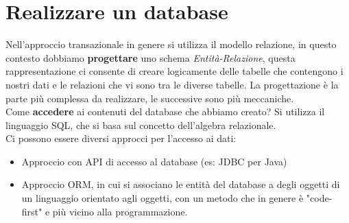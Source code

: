 \documentclass[a4paper,12pt]{report}
\begin{document}
\section{Realizzare un database}
Nell'approccio transazionale in genere si utilizza il modello relazione, in questo contesto dobbiamo \textbf{progettare} uno schema \textit{Entità-Relazione}, questa rappresentazione ci consente di creare logicamente delle tabelle che contengono i nostri dati e le relazioni che vi sono tra le diverse tabelle. La progettazione è la parte più complessa da realizzare, le successive sono più meccaniche.\\
Come \textbf{accedere} ai contenuti del database che abbiamo creato? Si utilizza il linguaggio SQL, che si basa sul concetto dell'algebra relazionale.\\
Ci possono essere diversi approcci per l'accesso ai dati:
\begin{itemize}
	\item Approccio con API di accesso al database (es: JDBC per Java)
	\item Approccio ORM, in cui si associano le entità del database a degli oggetti di un linguaggio orientato agli oggetti, con un metodo che in genere è "code-first" e più vicino alla programmazione.
\end{itemize}
\end{document}
